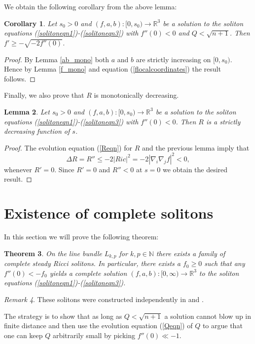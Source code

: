 \documentclass{amsart}
\newtheorem{thm}{Theorem}[section]
\newtheorem{lem}[thm]{Lemma}
\newtheorem{cor}[thm]{Corollary}
\theoremstyle{definition}
\theoremstyle{remark}
\newtheorem{remark}[thm]{Remark}
\numberwithin{equation}{section}
\newcommand{\R}{\mathbb{R}}  %
\newcommand{\N}{\mathbb{N}}
\begin{document}
We obtain the following corollary from the above lemma:

\begin{cor}
\label{df-lower-bound}
Let $s_0>0$ and $(f,a,b): [0,s_0) \rightarrow \R^3$ be a solution to the soliton equations (\ref{solitoneqn1})-(\ref{solitoneqn3}) with $f''(0) < 0$ and
$Q < \sqrt{n+1}$. Then $f' \geq - \sqrt{-2f''(0)}$.
\end{cor}
\begin{proof}
By Lemma \ref{ab_mono} both $a$ and $b$ are strictly increasing on $[0,s_0)$. Hence by Lemma \ref{f_mono} and equation (\ref{flocalcoordinates}) the result follows.
\end{proof}

Finally, we also prove that $R$ is monotonically decreasing.
\begin{lem}
\label{R_mono}
Let $s_0>0 $ and $(f,a,b): [0, s_0) \rightarrow \R^3$ be a solution to the soliton equations (\ref{solitoneqn1})-(\ref{solitoneqn3}) with $f''(0) <0$. Then $R$ is a strictly decreasing function of $s$.
\end{lem}
\begin{proof}
The evolution equation (\ref{Reqn}) for $R$ and the previous lemma imply that
$$\Delta R = R'' \leq -2|Ric|^2 = -2|\nabla_i\nabla_j f|^2 < 0,$$
whenever $R' = 0$. Since $R'= 0$ and $R''<0$ at $s=0$ we obtain the desired result.
\end{proof}


\section{Existence of complete solitons}
In this section we will prove the following theorem:
\begin{thm}
\label{thm-collapsed}
On the line bundle $L_{k,p}$ for $k, p \in \N$ there exists a family of complete steady Ricci solitons. In particular, there exists a $f_0 \geq 0$ such that any $f''(0) < -f_0$ yields a complete solution $(f,a,b): [0,\infty) \rightarrow \R^3$ to the soliton equations (\ref{solitoneqn1})-(\ref{solitoneqn3}).
\end{thm}

\begin{remark}
These solitons were constructed independently in \cite{Wink17} and \cite{Stol17}.
\end{remark}

The strategy is to show that as long as $Q  < \sqrt{n+1}$ a solution cannot blow up in finite distance and then use the evolution equation (\ref{Qeqn}) of $Q$ to argue that one can keep $Q$ arbitrarily small by picking $f''(0) \ll -1$.
\end{document}
